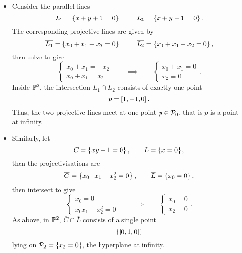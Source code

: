 \begin{example}
\hfill
\begin{itemize}
\item Consider the parallel lines
$$ L_1 = \cb{x + y + 1 = 0}, \qquad L_2 = \cb{x + y - 1 = 0}. $$
The corresponding projective lines are given by
$$ \overline{L_1} = \cb{x_0 + x_1 + x_2 = 0}, \qquad \overline{L_2} = \cb{x_0 + x_1 - x_2 = 0}, $$
then solve to give
$$
\begin{cases}
x_0 + x_1 = -x_2 \\
x_0 + x_1 = x_2
\end{cases}
\qquad \implies \qquad
\begin{cases}
x_0 + x_1 = 0 \\
x_2 = 0
\end{cases}.
$$
Inside $ \P^2 $, the intersection $ L_1 \cap L_2 $ consists of exactly one point
$$ p = \sb{1, -1, 0}. $$
Thus, the two projective lines meet at one point $ p \in \PP_0 $, that is $ p $ is a point at infinity.
\item Similarly, let
$$ C = \cb{xy - 1 = 0}, \qquad L = \cb{x = 0}, $$
then the projectivisations are
$$ \overline{C} = \cb{x_0 \cdot x_1 - x_2^2 = 0}, \qquad \overline{L} = \cb{x_0 = 0}, $$
then intersect to give
$$
\begin{cases}
x_0 = 0 \\
x_0x_1 - x_2^2 = 0
\end{cases}
\qquad \implies \qquad
\begin{cases}
x_0 = 0 \\
x_2 = 0
\end{cases}.
$$
As above, in $ \P^2 $, $ \overline{C} \cap \overline{L} $ consists of a single point
$$ \cb{\sb{0, 1, 0}} $$
lying on $ \PP_2 = \cb{x_2 = 0} $, the hyperplane at infinity.
\end{itemize}
\end{example}


